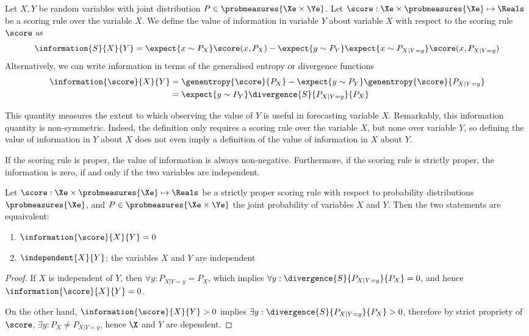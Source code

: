 \begin{definition}
	\label{def:value_of_information}
	Let $X,Y$ be random variables with joint distribution $P\in\probmeasures{\Xe\times\Ye}$. Let $\score:\Xe\times\probmeasures{\Xe}\mapsto\Reals$ be a scoring rule over the variable $X$. We define the value of information in variable $Y$ about variable $X$ with respect to the scoring rule $\score$ as
	\begin{equation}
		\information{S}{X}{Y} =  \expect{x\sim P_{X}}\score(x,P_{X})- \expect{y\sim P_{Y}} \expect{x\sim P_{X\vert Y=y}}\score(x,P_{X\vert Y=y})
	\end{equation}
	Alternatively, we can write information in terms of the generalised entropy or divergence functions
		\begin{align}
			\information{\score}{X}{Y} &=  \genentropy{\score}{P_{X}} - \expect{y \sim P_{Y}} \genentropy{\score}{P_{X\vert Y=y}}\\
				&= \expect{y\sim P_{Y}}\divergence{S}{P_{X\vert Y=y}}{P_{X}}
		\end{align}
\end{definition}

This quantity measures the extent to which observing the value of $Y$ is useful in forecasting variable $X$. Remarkably, this information quantity is non-symmetric. Indeed, the definition only requires a scoring rule over the variable $X$, but none over variable $Y$, so defining the value of information in $Y$ about $X$ does not even imply a definition of the value of information in $X$ about $Y$.

If the scoring rule is proper, the value of information is always non-negative. Furthermore, if the scoring rule is strictly proper, the information is zero, if and only if the two variables are independent.

\begin{theorem}
	Let $\score:\Xe\times\probmeasures{\Xe}\mapsto\Reals$ be a strictly proper scoring rule with respect to probability distributions $\probmeasures{\Xe}$, and $P\in\probmeasures{\Xe\times\Ye}$ the joint probability of variables $X$ and $Y$. Then the two statements are equaivalent:
	\begin{enumerate}
		\item $\information{\score}{X}{Y} = 0$
		\item $\independent{X}{Y}$; the variables $X$ and $Y$ are independent
	\end{enumerate}
	\begin{proof}
		If $X$ is independent of $Y$, then $\forall y: P_{X\vert Y=y} = P_{X}$, which implies $\forall y:  \divergence{S}{P_{X\vert Y=y}}{P_{X}}=0$, and hence $\information{\score}{X}{Y} = 0$.
		
		On the other hand, $\information{\score}{X}{Y} > 0$ implies $\exists y: \divergence{S}{P_{X\vert Y=y}}{P_{X}} > 0$, therefore by strict propriety of $\score$, $\exists y: P_X \neq P_{X\vert Y=y}$, hence $\X$ and $Y$ are dependent.
	\end{proof}
\end{theorem}

